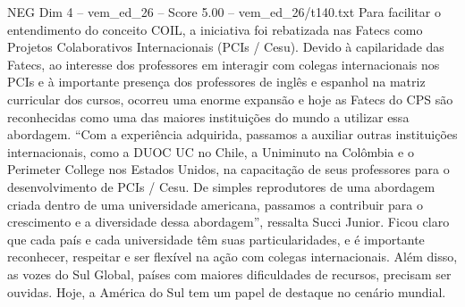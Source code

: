 \begin{textsample}{NEG Dim 4 – vem\_ed\_26 – Score 5.00 – vem\_ed\_26/t140.txt}
Para facilitar o entendimento do conceito COIL, a iniciativa foi rebatizada nas Fatecs como Projetos Colaborativos Internacionais (PCIs / Cesu).
Devido à capilaridade das Fatecs, ao interesse dos professores em interagir com colegas internacionais nos PCIs e à importante presença dos professores de inglês e espanhol na matriz curricular dos cursos, ocorreu uma enorme expansão e hoje as Fatecs do CPS são reconhecidas como uma das maiores instituições do mundo a utilizar essa abordagem. “Com a experiência adquirida, passamos a auxiliar outras instituições internacionais, como a DUOC UC no Chile, a Uniminuto na Colômbia e o Perimeter College nos Estados Unidos, na capacitação de seus professores para o desenvolvimento de PCIs / Cesu.
De simples reprodutores de uma abordagem criada dentro de uma universidade americana, passamos a contribuir para o crescimento e a diversidade dessa abordagem”, ressalta Succi Junior.
Ficou claro que cada país e cada universidade têm suas particularidades, e é importante reconhecer, respeitar e ser flexível na ação com colegas internacionais.
Além disso, as vozes do Sul Global, países com maiores dificuldades de recursos, precisam ser ouvidas.
Hoje, a América do Sul tem um papel de destaque no cenário mundial.

\end{textsample}
